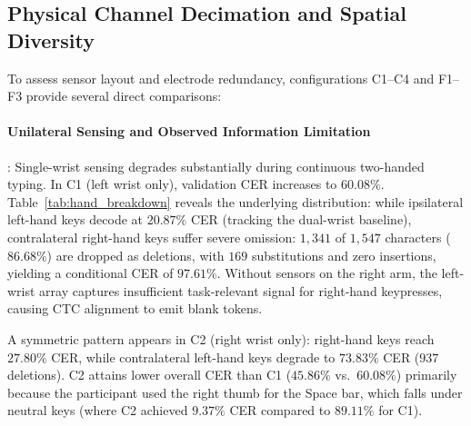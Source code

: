 \documentclass{article}
\begin{document}
\subsection{Physical Channel Decimation and Spatial Diversity}
\label{sec:decimation}
To assess sensor layout and electrode redundancy, configurations C1--C4 and F1--F3 provide several direct comparisons:

\paragraph{Unilateral Sensing and Observed Information Limitation}:
Single-wrist sensing degrades substantially during continuous two-handed typing. In C1 (left wrist only), validation CER increases to $\mathbf{60.08\%}$. Table~\ref{tab:hand_breakdown} reveals the underlying distribution: while ipsilateral left-hand keys decode at $20.87\%$ CER (tracking the dual-wrist baseline), contralateral right-hand keys suffer severe omission: $1{,}341$ of $1{,}547$ characters ($86.68\%$) are dropped as deletions, with $169$ substitutions and zero insertions, yielding a conditional CER of $97.61\%$. Without sensors on the right arm, the left-wrist array captures insufficient task-relevant signal for right-hand keypresses, causing CTC alignment to emit blank tokens.

A symmetric pattern appears in C2 (right wrist only): right-hand keys reach $27.80\%$ CER, while contralateral left-hand keys degrade to $73.83\%$ CER ($937$ deletions). C2 attains lower overall CER than C1 ($45.86\%$ vs.\ $60.08\%$) primarily because the participant used the right thumb for the Space bar, which falls under neutral keys (where C2 achieved $9.37\%$ CER compared to $89.11\%$ for C1).
\end{document}
